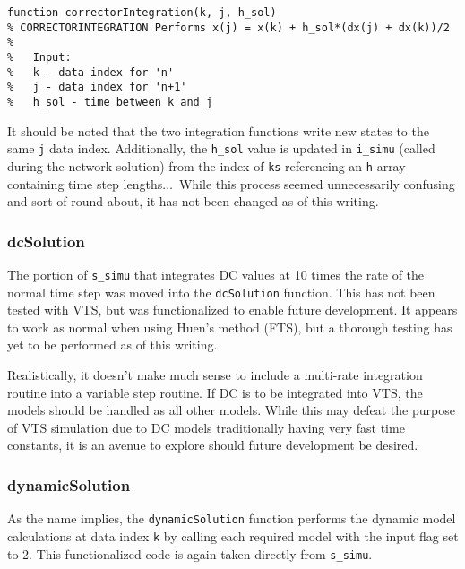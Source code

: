 \begin{verbatim}
function correctorIntegration(k, j, h_sol)
% CORRECTORINTEGRATION Performs x(j) = x(k) + h_sol*(dx(j) + dx(k))/2
%
%   Input:
%   k - data index for 'n'
%   j - data index for 'n+1'
%   h_sol - time between k and j
\end{verbatim}

It should be noted that the two integration functions write new states to the same \verb|j| data index.
Additionally, the \verb|h_sol| value is updated in \verb|i_simu| (called during the network solution) from the index of \verb|ks| referencing an \verb|h| array containing time step lengths$\ldots$\ 
While this process seemed unnecessarily confusing and sort of  round-about, it has not been changed as of this writing.

\subsubsection{dcSolution}  
The portion of \verb|s_simu| that integrates DC values at 10 times the rate of the normal time step was moved into the \verb|dcSolution| function.
This has not been tested with VTS, but was functionalized to enable future development.
It appears to work as normal when using Huen's method (FTS), but a thorough testing has yet to be performed as of this writing.

Realistically, it doesn't make much sense to include a multi-rate integration routine into a variable step routine.
If DC is to be integrated into VTS, the models should be handled as all other models.
While this may defeat the purpose of VTS simulation due to DC models traditionally having very fast time constants, it is an avenue to explore should future development be desired.

\subsubsection{dynamicSolution}  
As the name implies, the \verb|dynamicSolution| function performs the dynamic model calculations at data index \verb|k| by calling each required model with the input flag set to 2.
This functionalized code is again taken directly from \verb|s_simu|.

